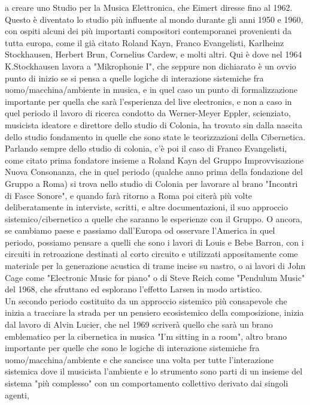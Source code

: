 a creare uno Studio per la Musica Elettronica, che Eimert diresse fino al 1962.
Questo è diventato lo studio più influente al mondo durante gli anni 1950 e 1960,
con ospiti alcuni dei più importanti compositori contemporanei provenienti da tutta europa,
come il già citato Roland Kayn, Franco Evangelisti, Karlheinz Stockhausen, Herbert Brun,
Cornelius Cardew, e molti altri.
Qui è dove nel 1964 K.Stockhausen lavora a "Mikrophonie I", che seppure non dichiarato è un ovvio punto di inizio
se si pensa a quelle logiche di interazione sistemiche fra uomo/macchina/ambiente in musica,
e in quel caso un punto di formalizzazione importante per quella che sarà l'esperienza del live electronics,
e non a caso in quel periodo il lavoro di ricerca condotto da Werner-Meyer Eppler,
scienziato, musicista ideatore e direttore dello studio di Colonia,
ha trovato sin dalla nascita dello studio fondamento in quelle che sono state
le teorizzazioni della Cibernetica.
Parlando sempre dello studio di colonia, c'è poi il caso di Franco Evangelisti,
come citato prima fondatore insieme a Roland Kayn del Gruppo Improvvisazione Nuova Consonanza,
che in quel periodo (qualche anno prima della fondazione del Gruppo a Roma)
si trova nello studio di Colonia per lavorare al brano "Incontri di Fasce Sonore",
e quando farà ritorno a Roma poi citerà più volte deliberatamente in interviste, scritti,
e altre documentazioni, il suo approccio sistemico/cibernetico a quelle che saranno le esperienze con
il Gruppo.
O ancora, se cambiamo paese e passiamo dall'Europa od osservare l'America in quel periodo,
possiamo pensare a quelli che sono i lavori di Louis e Bebe Barron,
con i circuiti in retroazione destinati al corto circuito
e utilizzati appositamente come materiale per la generazione acustica di trame incise su nastro,
o ai lavori di John Cage come "Electronic Music for piano" o di Steve Reich come "Pendulum Music" del 1968,
che sfruttano ed esplorano l'effetto Larsen in modo artistico.
\\
Un secondo periodo costituito da un approccio sistemico più consapevole
che inizia a tracciare la strada per un pensiero ecosistemico della composizione, inizia dal lavoro
di Alvin Lucier, che nel 1969 scriverà quello che sarà un brano emblematico per
la cibernetica in musica "I'm sitting in a room", altro brano importante per quelle che sono
le logiche di interazione sistemiche fra uomo/macchina/ambiente e che sancisce una volta per tutte
l'interazione sistemica dove il musicista l'ambiente e lo strumento sono parti di un insieme del
sistema "più complesso" con un comportamento collettivo derivato dai singoli agenti,
